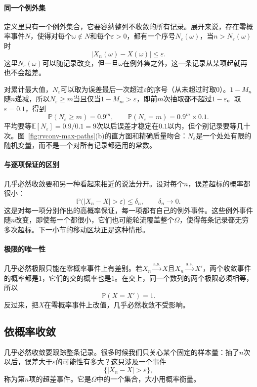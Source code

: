 \paragraph{同一个例外集}
定义里只有一个例外集合，它要容纳整列不收敛的所有记录。展开来说，存在零概率事件$N$，使得对每个$\omega\notin N$和每个$\varepsilon>0$，都有一个序号$N_{\varepsilon}(\omega)$，当$n>N_{\varepsilon}(\omega)$时
\[
 \lvert X_n(\omega)-X(\omega)\rvert\leq\varepsilon .
\]
这里$N_{\varepsilon}(\omega)$可以随记录改变，但一旦$\omega$在例外集之外，这一条记录从某项起就再也不会超差。

对累计最大值，$N_{\varepsilon}$可以取为误差最后一次超过$\varepsilon$的序号（从未超过时取$0$）。$1-M_n$随$n$递减，所以$N_{\varepsilon}\geq m$当且仅当$1-M_m>\varepsilon$，即前$m$次抽取都不超过$1-\varepsilon$。取$\varepsilon=0.1$，得到
\[
 \mathbb{P}(N_{\varepsilon}\geq m)=0.9^{m},\qquad
 \mathbb{P}(N_{\varepsilon}=m)=0.9^{m}\times0.1 .
\]
平均要等$\mathbb{E}[N_{\varepsilon}]=0.9/0.1=9$次以后误差才稳定在$0.1$以内，但个别记录要等几十次。图~\ref{fig:rvconv-max-paths}(b)的直方图和精确质量吻合：$N_{\varepsilon}$是一个处处有限的随机变量，而不是一个对所有记录都适用的常数。

\paragraph{与逐项保证的区别}
几乎必然收敛要和另一种看起来相近的说法分开。设对每个$n$，误差超标的概率都很小：
\[
 \mathbb{P}\bigl(\lvert X_n-X\rvert>\varepsilon\bigr)\leq\delta_n,\qquad \delta_n\to0 .
\]
这是对每一项分别作出的高概率保证，每一项都有自己的例外事件。这些例外事件随$n$改变，即使每一个都很小，它们也可能轮流覆盖整个$\Omega$，使得每条记录都无穷多次超标。下一小节的移动区块正是这种情形。

\paragraph{极限的唯一性}
几乎必然极限只能在零概率事件上有差别。若$X_n\xrightarrow{\mathrm{a.s.}}X$且$X_n\xrightarrow{\mathrm{a.s.}}X'$，两个收敛事件的概率都是$1$，它们的交的概率也是$1$。在交上，同一个数列的两个极限必须相等，所以
\[
 \mathbb{P}(X=X')=1 .
\]
反过来，把$X$在零概率事件上改值，几乎必然收敛不受影响。

\subsection{依概率收敛}
\label{sec:rvconv-convergence-in-probability}

几乎必然收敛要跟踪整条记录。很多时候我们只关心某个固定的样本量：抽了$n$次以后，误差大于$\varepsilon$的可能性有多大？这只涉及一个事件
\[
 \{\lvert X_n-X\rvert>\varepsilon\},
\]
称为第$n$项的超差事件。它是$\Omega$中的一个集合，大小用概率衡量。


